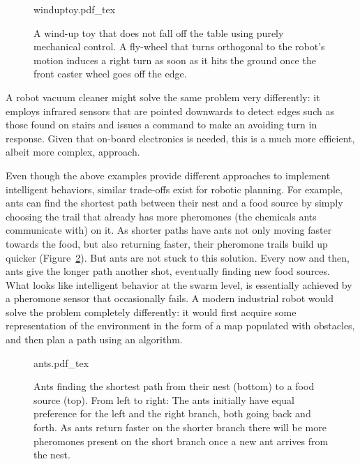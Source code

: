 \begin{figure}
    \centering
    \def\svgwidth{\textwidth}
    {winduptoy.pdf_tex}
    \caption{A wind-up toy that does not fall off the table using purely mechanical control. A fly-wheel that turns orthogonal to the robot's motion induces a right turn as soon as it hits the ground once the front caster wheel goes off the edge.}
    \label{fig:winduptoy}
\end{figure}

A robot vacuum cleaner might solve the same problem very differently: it employs infrared sensors that are pointed downwards to detect edges such as those found on stairs and issues a command to make an avoiding turn in response. Given that on-board electronics is needed, this is a much more efficient, albeit more complex, approach.

Even though the above examples provide different approaches to implement intelligent behaviors, similar trade-offs exist for robotic planning. For example, ants can find the shortest path between their nest and a food source by simply choosing the trail that already has more pheromones (the chemicals ants communicate with) on it. As shorter paths have ants not only moving faster towards the food, but also returning faster, their pheromone trails build up quicker (Figure~\ref{fig:ants}). But ants are not stuck to this solution. Every now and then, ants give the longer path another shot, eventually finding new food sources. What looks like intelligent behavior at the swarm level, is essentially achieved by a pheromone sensor that occasionally fails. A modern industrial robot would solve the problem completely differently: it would first acquire some representation of the environment in the form of a map populated with obstacles, and then plan a path using an algorithm.

\begin{figure}
    \centering
    \def\svgwidth{\textwidth}
    {ants.pdf_tex}
    \caption{Ants finding the shortest path from their nest (bottom) to a food source (top). From left to right: The ants initially have equal preference for the left and the right branch, both going back and forth. As ants return faster on the shorter branch there will be more pheromones present on the short branch once a new ant arrives from the nest.}
    \label{fig:ants}
\end{figure}

